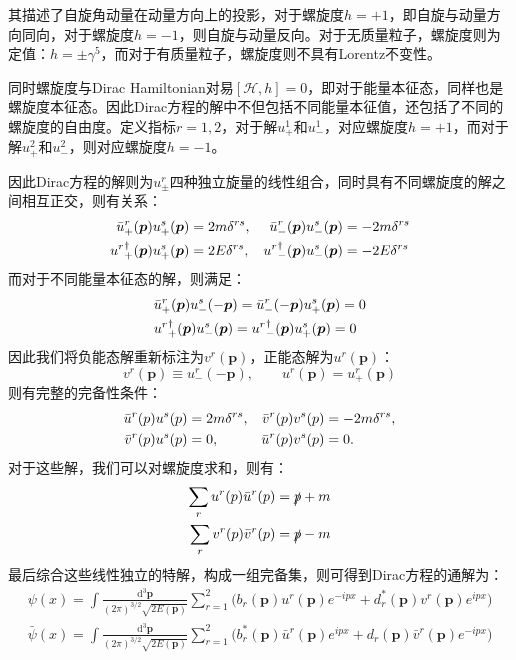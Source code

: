 其描述了自旋角动量在动量方向上的投影，对于螺旋度$h=+1$，即自旋与动量方向同向，对于螺旋度$h=-1$，则自旋与动量反向。对于无质量粒子，螺旋度则为定值：$h=\pm\gamma^5$，而对于有质量粒子，螺旋度则不具有Lorentz不变性。
\par 同时螺旋度与Dirac Hamiltonian对易$[\mathscr{H},h]=0$，即对于能量本征态，同样也是螺旋度本征态。因此Dirac方程的解中不但包括不同能量本征值，还包括了不同的螺旋度的自由度。定义指标$r=1,2$，对于解$u^1_+$和$u^1_-$，对应螺旋度$h=+1$，而对于解$u^2_+$和$u^2_-$，则对应螺旋度$h=-1$。
\par 因此Dirac方程的解则为$u^r_{\pm}$四种独立旋量的线性组合，同时具有不同螺旋度的解之间相互正交，则有关系：
\begin{align}
\bar{u}^r_{+}(\boldsymbol{p})u^s_{+}(\boldsymbol{p})&=2m\delta^{rs},& \bar{u}^r_-(\boldsymbol{p}) u^s_-(\boldsymbol{p}) &=-2m\delta^{rs}\notag\\
{u^r}^\dagger_{+}(\boldsymbol{p})u^s_{+}(\boldsymbol{p})&=2E\delta^{rs},& {u^r}^\dagger_-(\boldsymbol{p}) u^s_-(\boldsymbol{p})& =-2E\delta^{rs}
\end{align}
而对于不同能量本征态的解，则满足：
\begin{align}
&\bar{u}^r_+(\boldsymbol{p})u^s_-(-\boldsymbol{p})=\bar{u}^r_-(-\boldsymbol{p})u^s_+(\boldsymbol{p})=0\notag\\
&{u^r}^\dagger_+(\boldsymbol{p})u^s_-(\boldsymbol{p})={u^r}^\dagger_-(\boldsymbol{p})u^s_+(\boldsymbol{p})=0
\end{align}
因此我们将负能态解重新标注为$v^r(\boldsymbol{p})$，正能态解为$u^r(\boldsymbol{p})$：
\begin{equation}
v^r(\boldsymbol{p})\equiv u^r_-(-\boldsymbol{p}),\qquad u^r(\boldsymbol{p})=u^r_+(\boldsymbol{p})
\end{equation}
则有完整的完备性条件：
\begin{align}
\bar{u}^r({p}) u^s({p})&=2m\delta^{rs},&\bar{v}^r({p}) v^s({p})&=-2m\delta^{rs},\notag\\
\bar{v}^r({p}) u^s({p})&=0,&\bar{u}^r({p}) v^s({p})&=0.
\end{align}
对于这些解，我们可以对螺旋度求和，则有：
\begin{equation}
\begin{split}
\sum_{r}u^r({p})\bar{u}^r({p})=\slashed{p}+m\\
\sum_{r}v^r({p})\bar{v}^r({p})=\slashed{p}-m
\end{split}
\label{eq:helsum}
\end{equation}
最后综合这些线性独立的特解，构成一组完备集，则可得到Dirac方程的通解为：
\begin{align}
\psi(x)=\int\frac{\mathrm{d}^3\boldsymbol{p}}{(2\pi)^{3/2}\sqrt{2E(\boldsymbol{p})}}\sum_{r=1}^{2}\Big(b_r(\boldsymbol{p})u^r(\boldsymbol{p})e^{-ipx}+d^*_r(\boldsymbol{p})v^r(\boldsymbol{p})e^{ipx}\Big)\\
\bar{\psi}(x)=\int\frac{\mathrm{d}^3\boldsymbol{p}}{(2\pi)^{3/2}\sqrt{2E(\boldsymbol{p})}}\sum_{r=1}^{2}\Big(b^*_r(\boldsymbol{p})\bar{u}^r(\boldsymbol{p})e^{ipx}+d_r(\boldsymbol{p})\bar{v}^r(\boldsymbol{p})e^{-ipx}\Big)
\end{align}
